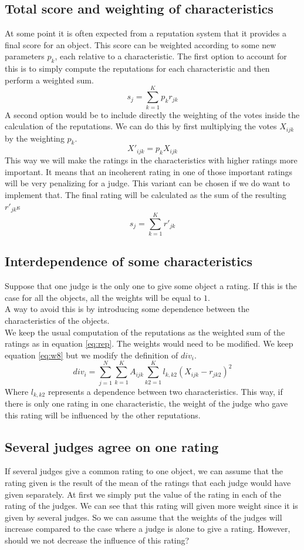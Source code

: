 \documentclass[12pt,a4paper]{article}
\begin{document}
\subsection{Total score and weighting of characteristics}
At some point it is often expected from a reputation system that it provides a final score for an object. This score can be weighted according to some new parameters $p_k$, each relative to a characteristic.
The first option to account for this is to simply compute the reputations for each characteristic and then perform a weighted sum.
$$ s_j = \sum_{k=1}^K p_k r_{jk} $$
A second option would be to include directly the weighting of the votes inside the calculation of the reputations. We can do this by first multiplying the votes $X_{ijk}$ by the weighting $p_k$. 
$$X'_{ijk} = p_k X_{ijk}$$
This way we will make the ratings in the characteristics with higher ratings more important. It means that an incoherent rating in one of those important ratings will be very penalizing for a judge. This variant can be chosen if we do want to implement that.
The final rating will be calculated as the sum of the resulting $r'_{jk}$s
$$ s_j = \sum_{k=1}^K r'_{jk}$$

\subsection{Interdependence of some characteristics}
Suppose that one judge is the only one to give some object a rating. If this is the case for all the objects, all the weights will be equal to $1$.\\
A way to avoid this is by introducing some dependence between the characteristics of the objects.\\
We keep the usual computation of the reputations as the weighted sum of the ratings as in equation \ref{eq:rep}. The weights would need to be modified. We keep equation \ref{eq:w8} but we modify the definition of $div_i$.
$$div_i = \sum_{j=1}^N \sum_{k=1}^K A_{ijk} \sum_{k2=1}^K l_{k,k2} (X_{ijk}-r_{jk2})^2$$
Where $l_{k,k2}$ represents a dependence between two characteristics. This way, if there is only one rating in one characteristic, the weight of the judge who gave this rating will be influenced by the other reputations.

\subsection{Several judges agree on one rating}
If several judges give a common rating to one object, we can assume that the rating given is the result of the mean of the ratings that each judge would have given separately. At first we simply put the value of the rating in each of the rating of the judges. We can see that this rating will given more weight since it is given by several judges. So we can assume that the weights of the judges will increase compared to the case where a judge is alone to give a rating. However, should we not decrease the influence of this rating?
\end{document}
